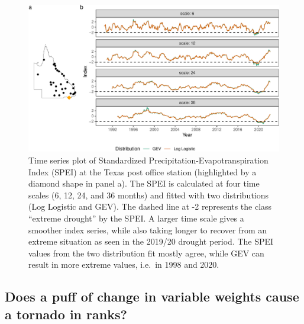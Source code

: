 \documentclass[
]{interact}
\begin{document}
\begin{figure}

{\centering \includegraphics{tidyindex_files/figure-pdf/fig-compute-temporal-1.pdf}

}

\caption{\label{fig-compute-temporal}Time series plot of Standardized
Precipitation-Evapotranspiration Index (SPEI) at the Texas post office
station (highlighted by a diamond shape in panel a). The SPEI is
calculated at four time scales (6, 12, 24, and 36 months) and fitted
with two distributions (Log Logistic and GEV). The dashed line at -2
represents the class ``extreme drought'' by the SPEI. A larger time
scale gives a smoother index series, while also taking longer to recover
from an extreme situation as seen in the 2019/20 drought period. The
SPEI values from the two distribution fit mostly agree, while GEV can
result in more extreme values, i.e.~in 1998 and 2020.}

\end{figure}

\hypertarget{does-a-puff-of-change-in-variable-weights-cause-a-tornado-in-ranks}{%
\subsection{Does a puff of change in variable weights cause a tornado in
ranks?}\label{does-a-puff-of-change-in-variable-weights-cause-a-tornado-in-ranks}}
\end{document}
